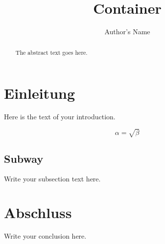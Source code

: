 \documentclass{article}
\begin{document}
\title{Container}
\author{Author's Name}

\maketitle

\begin{abstract}
The abstract text goes here.
\end{abstract}

\tableofcontents

\section{Einleitung}
Here is the text of your introduction.

\begin{equation}
    \label{simple_equation}
    \alpha = \sqrt{ \beta }
\end{equation}

\subsection{Subway}
Write your subsection text here.

\section{Abschluss}
Write your conclusion here.
\end{document}
